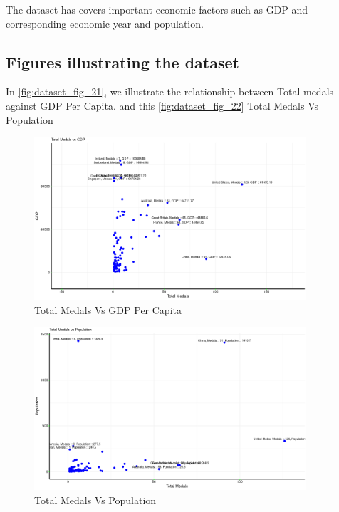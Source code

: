 \documentclass[a4paper,12pt]{article}
\begin{document}
The dataset has covers important economic factors such as GDP and corresponding economic year and population.
\subsection{Figures illustrating the dataset}
In \autoref{fig:dataset_fig_21}, we illustrate the relationship between Total medals against GDP Per Capita. and this  \autoref{fig:dataset_fig_22} Total Medals Vs Population




\begin{figure}[H]
    \centering
    \includegraphics[width=0.9\textwidth]{images/Total_Medals_vs_GDP_plot.png}
    \caption{Total Medals Vs GDP Per Capita}
    \label{fig:dataset_fig_21}
\end{figure}



\begin{figure}[H]
    \centering
    \includegraphics[width=0.9\textwidth]{images/Total_Medals_vs_Population_plot.png}
    \caption{Total Medals Vs Population}
    \label{fig:dataset_fig_22}
\end{figure}
\end{document}
